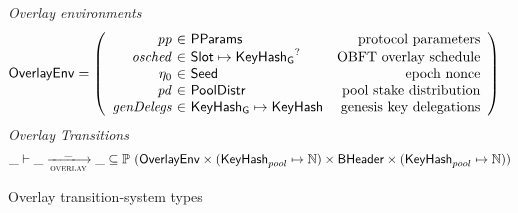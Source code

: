 \begin{figure}
  \emph{Overlay environments}
  \begin{equation*}
    \OverlayEnv =
    \left(
      \begin{array}{r@{~\in~}lr}
        \var{pp} & \PParams & \text{protocol parameters} \\
        \var{osched} & \Slot\mapsto\KeyHashGen^? & \text{OBFT overlay schedule} \\
        \eta_0 & \Seed & \text{epoch nonce} \\
        \var{pd} & \PoolDistr & \text{pool stake distribution} \\
        \var{genDelegs} & \KeyHashGen\mapsto\KeyHash & \text{genesis key delegations} \\
      \end{array}
    \right)
  \end{equation*}
  \emph{Overlay Transitions}
  \begin{equation*}
    \_ \vdash \var{\_} \trans{overlay}{\_} \var{\_} \subseteq
    \powerset (\OverlayEnv \times (\KeyHash_{pool} \mapsto \N) \times \BHeader \times
    (\KeyHash_{pool} \mapsto \N))
  \end{equation*}
  \caption{Overlay transition-system types}
  \label{fig:ts-types:overlay}
\end{figure}

